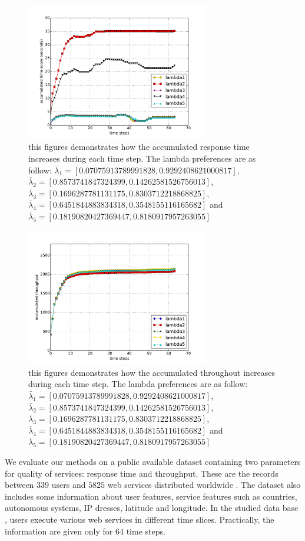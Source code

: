 \documentclass[10pt,journal,compsoc]{IEEEtran}
\begin{document}
\begin{figure}[t]
\includegraphics[width=8cm]{graphs/rt_step}
\caption{this figures demonstrates how the accumulated response time increases during each time step. The lambda preferences are as follow:  $\bar{\lambda}_1 =[0.07075913789991828, 0.9292408621000817]$, $\bar{\lambda}_2 = [0.8573741847324399, 0.14262581526756013]$, $\bar{\lambda}_3 = [0.1696287781131175, 0.8303712218868825]$, $\bar{\lambda}_4 = [0.6451844883834318, 0.3548155116165682]$ and $\bar{\lambda}_5 = [0.18190820427369447, 0.8180917957263055]	$}
\centering
\end{figure}

\begin{figure}[t]
\includegraphics[width=8cm]{graphs/trough_step}
\caption{this figures demonstrates  how the accumulated throughout increases during each time step. The lambda preferences are as follow:  $\bar{\lambda}_1 =[0.07075913789991828, 0.9292408621000817]$, $\bar{\lambda}_2 = [0.8573741847324399, 0.14262581526756013]$, $\bar{\lambda}_3 = [0.1696287781131175, 0.8303712218868825]$, $\bar{\lambda}_4 = [0.6451844883834318, 0.3548155116165682]$ and $\bar{\lambda}_5 = [0.18190820427369447, 0.8180917957263055]	$}
\centering
\end{figure}


We evaluate our methods on a public available dataset containing two parameters for quality of services: response time and throughput. These are the records between $339$ users and $5825$ web services distributed worldwide \cite{10.1109/TSC.2012.34}. The dataset also includes some information about user features, service features such as countries, autonomous systems, IP dresses, latitude and longitude. In the studied data base \cite{10.1109/TSC.2012.34}, users execute various web services in different time slices. Practically, the information are given only for $64$ time steps. 
\end{document}
